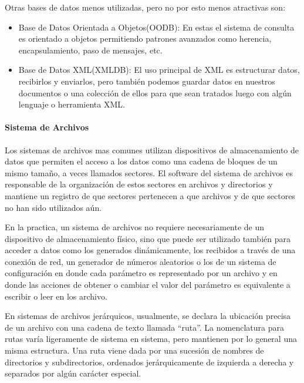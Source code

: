 Otras bases de datos menos utilizadas, pero no por esto menos atractivas son:

\begin{itemize}

	\item Base de Datos Orientada a Objetos(OODB): En estas el sistema de consulta es orientado a objetos permitiendo patrones avanzados como herencia, encapsulamiento, paso de mensajes, etc.
	
	\item Base de Datos XML(XMLDB): El uso principal de XML es estructurar datos, recibirlos y enviarlos, pero también podemos guardar datos en nuestros documentos o una colección de ellos para que sean tratados luego con algún lenguaje o herramienta XML.

\end{itemize}


\paragraph{Sistema de Archivos}

Los sistemas de archivos mas comunes utilizan dispositivos de almacenamiento de datos que permiten el acceso a los datos como una cadena de bloques de un mismo tamaño, a veces llamados sectores. El software del sistema de archivos es responsable de la organización de estos sectores en archivos y directorios y mantiene un registro de que sectores pertenecen a que archivos y de que sectores no han sido utilizados aún.

En la practica, un sistema de archivos no requiere necesariamente de un dispositivo de almacenamiento físico, sino que puede ser utilizado también para acceder a datos como los generados dinámicamente, los recibidos a través de una conexión de red, un generador de números aleatorios o los de un sistema de configuración en donde cada parámetro es representado por un archivo y en donde las acciones de obtener o cambiar el valor del parámetro es equivalente a escribir o leer en los archivo.

En sistemas de archivos jerárquicos, usualmente, se declara la ubicación precisa de un archivo con una cadena de texto llamada ``ruta''. La nomenclatura para rutas varía ligeramente de sistema en sistema, pero mantienen por lo general una misma estructura. Una ruta viene dada por una sucesión de nombres de directorios y subdirectorios, ordenados jerárquicamente de izquierda a derecha y separados por algún carácter especial.


